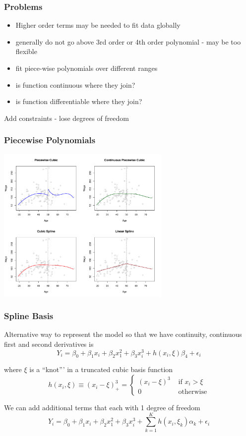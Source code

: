 \documentclass[]{beamer}
\begin{document}
\begin{frame}\frametitle{Problems}
  \begin{itemize}
  \item Higher order terms may be needed to fit data globally \pause
  \item generally do not go above 3rd order or 4th order polynomial -
        may be too flexible \pause
  \item fit piece-wise polynomials over different ranges \pause
  \item is function continuous where they join? \pause
  \item is function differentiable where they join? \pause 
  \end{itemize}
Add constraints - lose degrees of freedom
\end{frame}

\begin{frame}\frametitle{Piecewise Polynomials}

\centerline{\includegraphics[height=3in]{7-3}}

\end{frame}
\begin{frame}\frametitle{Spline Basis}
Alternative way to represent the model so that we have continuity, continuous first and
second derivatives  is 
$$Y_i = \beta_0 + \beta_1 x_i + \beta_2 x_1^2 + \beta_3 x_i^3 + h(x_i,\xi) \beta_4 + \epsilon_i$$

where $\xi$ is a ``knot''' in a truncated cubic basis function
$$
h(x_i, \xi) \equiv (x_i - \xi)^3_+ =  \left\{
\begin{array}{ll}
  (x_i - \xi)^3 & \text{ if }  x_i > \xi \\
  0 & \text{ otherwise} 
\end{array} \right.
$$\pause

We can add additional terms that each with 1 degree of freedom
$$Y_i = \beta_0 + \beta_1 x_i + \beta_2 x_1^2 + \beta_3 x_i^3 +
\sum_{k=1}^{K}h(x_i,\xi_k) \alpha_{k} + \epsilon_i$$ \pause


\end{frame}
\end{document}
